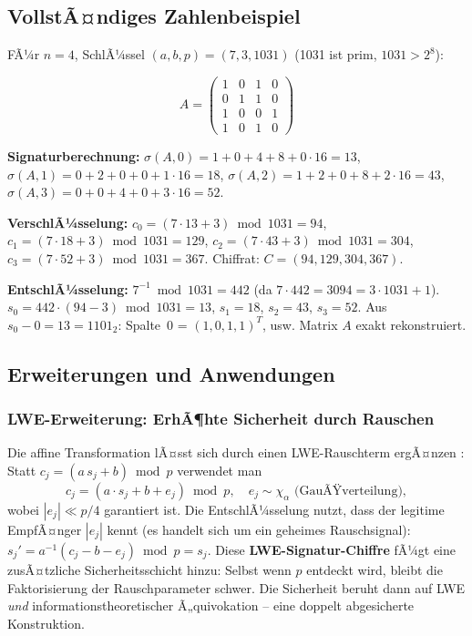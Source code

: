 ﻿\documentclass[a4paper,12pt]{article}
\theoremstyle{definition}
\begin{document}
\subsection{VollstÃ¤ndiges Zahlenbeispiel}

FÃ¼r $n = 4$, SchlÃ¼ssel $(a, b, p) = (7, 3, 1031)$ (1031 ist prim, $1031 > 2^8$):

\[
A = \begin{pmatrix} 1 & 0 & 1 & 0 \\ 0 & 1 & 1 & 0 \\ 1 & 0 & 0 & 1 \\ 1 & 0 & 1 & 0 \end{pmatrix}
\]

\textbf{Signaturberechnung:}
$\sigma(A,0) = 1 + 0 + 4 + 8 + 0\cdot16 = 13$,\;
$\sigma(A,1) = 0 + 2 + 0 + 0 + 1\cdot16 = 18$,\;
$\sigma(A,2) = 1 + 2 + 0 + 8 + 2\cdot16 = 43$,\;
$\sigma(A,3) = 0 + 0 + 4 + 0 + 3\cdot16 = 52$.

\textbf{VerschlÃ¼sselung:}
$c_0 = (7\cdot13+3)\bmod 1031 = 94$,\;
$c_1 = (7\cdot18+3)\bmod 1031 = 129$,\;
$c_2 = (7\cdot43+3)\bmod 1031 = 304$,\;
$c_3 = (7\cdot52+3)\bmod 1031 = 367$.
Chiffrat: $C = (94, 129, 304, 367)$.

\textbf{EntschlÃ¼sselung:}
$7^{-1} \bmod 1031 = 442$ (da $7 \cdot 442 = 3094 = 3 \cdot 1031 + 1$).
$s_0 = 442\cdot(94-3)\bmod 1031 = 13$,\;
$s_1 = 18$,\;
$s_2 = 43$,\;
$s_3 = 52$.
Aus $s_0 - 0 = 13 = 1101_2$: Spalte~0 = $(1,0,1,1)^T$, usw. Matrix $A$ exakt rekonstruiert.

\subsection{Erweiterungen und Anwendungen}

\subsubsection{LWE-Erweiterung: ErhÃ¶hte Sicherheit durch Rauschen}

Die affine Transformation lÃ¤sst sich durch einen LWE-Rauschterm ergÃ¤nzen
\cite{Epp26b}: Statt $c_j = (a\,s_j + b)\bmod p$ verwendet man
\[
  c_j = (a \cdot s_j + b + e_j) \bmod p, \quad e_j \sim \chi_\alpha \text{ (GauÃŸverteilung)},
\]
wobei $|e_j| \ll p/4$ garantiert ist. Die EntschlÃ¼sselung nutzt, dass der legitime
EmpfÃ¤nger $|e_j|$ kennt (es handelt sich um ein geheimes Rauschsignal):
$s_j' = a^{-1}(c_j - b - e_j) \bmod p = s_j$.
Diese \textbf{LWE-Signatur-Chiffre} fÃ¼gt eine zusÃ¤tzliche Sicherheitsschicht
hinzu: Selbst wenn $p$ entdeckt wird, bleibt die Faktorisierung der Rauschparameter
schwer. Die Sicherheit beruht dann auf LWE \emph{und} informationstheoretischer
Ã„quivokation -- eine doppelt abgesicherte Konstruktion.
\end{document}
